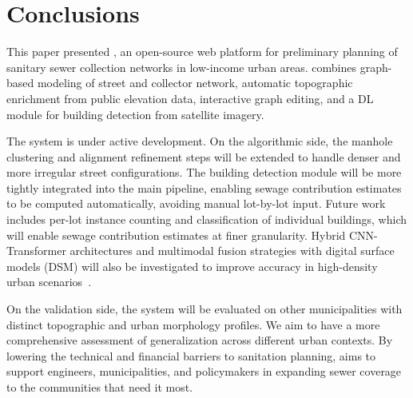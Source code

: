 \section{Conclusions}\label{sec:conclusions}

This paper presented \method, an open-source web platform for preliminary planning of sanitary sewer collection networks in low-income urban areas.
\method combines graph-based modeling of street and collector network, automatic topographic enrichment from public elevation data, interactive graph editing, and a DL module for building detection from satellite imagery.

The system is under active development.
On the algorithmic side, the manhole clustering and alignment refinement steps will be extended to handle denser and more irregular street configurations.
The building detection module will be more tightly integrated into the main pipeline, enabling sewage contribution estimates to be computed automatically, avoiding manual lot-by-lot input.
Future work includes per-lot instance counting and classification of individual buildings, which will enable sewage contribution estimates at finer granularity.
Hybrid CNN-Transformer architectures and multimodal fusion strategies with digital surface models (DSM) will also be investigated to improve accuracy in high-density urban scenarios~\cite{zhou2024hierarchical}.

On the validation side, the system will be evaluated on other municipalities with distinct topographic and urban  morphology profiles.
We aim to have a more comprehensive assessment of generalization across different urban contexts.
By lowering the technical and financial barriers to sanitation planning, \method aims to support engineers, municipalities, and policymakers in expanding sewer coverage to the communities that need it most.
